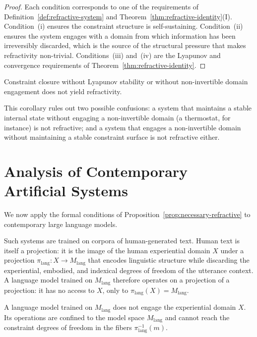 \documentclass[11pt,openany]{book}
\begin{document}
\begin{proof}
Each condition corresponds to one of the requirements of
Definition~\ref{def:refractive-system} and
Theorem~\ref{thm:refractive-identity}(I).  Condition~(i)
ensures the constraint structure is self-sustaining.
Condition~(ii) ensures the system engages with a domain
from which information has been irreversibly discarded,
which is the source of the structural pressure that makes
refractivity non-trivial.  Conditions~(iii) and~(iv) are
the Lyapunov and convergence requirements of
Theorem~\ref{thm:refractive-identity}.
\end{proof}

\begin{corollary}
Constraint closure without Lyapunov stability or without
non-invertible domain engagement does not yield
refractivity.
\end{corollary}

This corollary rules out two possible confusions: a system
that maintains a stable internal state without engaging a
non-invertible domain (a thermostat, for instance) is not
refractive; and a system that engages a non-invertible
domain without maintaining a stable constraint surface is
not refractive either.

\section{Analysis of Contemporary Artificial Systems}
\label{sec:analysis-ai}

We now apply the formal conditions of
Proposition~\ref{prop:necessary-refractive} to contemporary
large language models.

Such systems are trained on corpora of human-generated
text.  Human text is itself a projection: it is the image
of the human experiential domain $X$ under a projection
$\pi_{\mathrm{lang}} : X \to M_{\mathrm{lang}}$ that
encodes linguistic structure while discarding the
experiential, embodied, and indexical degrees of freedom
of the utterance context.  A language model trained on
$M_{\mathrm{lang}}$ therefore operates on a projection of
a projection: it has no access to $X$, only to
$\pi_{\mathrm{lang}}(X) = M_{\mathrm{lang}}$.

\begin{proposition}
\label{prop:llm-projected}
A language model trained on $M_{\mathrm{lang}}$ does not
engage the experiential domain $X$.  Its operations are
confined to the model space $M_{\mathrm{lang}}$ and cannot
reach the constraint degrees of freedom in the fibers
$\pi_{\mathrm{lang}}^{-1}(m)$.
\end{proposition}
\end{document}
